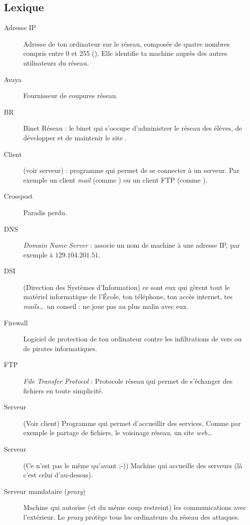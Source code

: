 \subsection{Lexique}

\begin{description}
  \item[Adresse IP] Adresse de ton ordinateur sur le réseau, composée de quatre nombres compris entre 0 et 255  (). Elle identifie ta machine auprès des autres utilisateurs du réseau.
  \item[Avaya] Fournisseur de coupures réseau.
  \item[BR] Binet Réseau : le binet qui s'occupe d'administrer le réseau des élèves, de développer et de maintenir le site .
  \item[Client] (voir serveur) : programme qui permet de se connecter à un serveur. Par exemple un client \emph{mail}
	(comme ) ou un client FTP (comme ).
  \item[Crosspost] Paradis perdu.
  \item[DNS] \emph{Domain Name Server} : associe un nom de machine à une adresse IP, par exemple  à  $129.104.201.51$.
  \item[DSI] (Direction des Systèmes d'Information) ce sont eux qui gèrent tout le matériel informatique de l'\'Ecole, ton téléphone, ton accès internet, tes \emph{mails}\ldots\ un conseil : ne joue pas au plus malin avec eux.
  \item[Firewall] Logiciel de protection de ton ordinateur contre les infiltrations de vers ou de pirates informatiques.
  \item[FTP] \emph{File Transfer Protocol} : Protocole réseau qui permet de s'échanger des fichiers en toute simplicit\'e.
  \item[Serveur] (Voir client) Programme qui permet d'accueillir des services. Comme par exemple le partage de fichiers, le voisinage réseau, un site \emph{web}\ldots\
  \item[Serveur] (Ce n'est pas le même qu'avant ;-)) Machine qui accueille des serveurs (là c'est celui d'au-dessus).
    \item[Serveur mandataire (\emph{proxy})] Machine qui autorise (et du même coup restreint) les communications avec l'extérieur. Le \emph{proxy} protège tous les ordinateurs du réseau des attaques.

\end{description}
